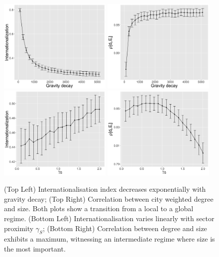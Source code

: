 \documentclass[11pt]{article}
\begin{document}
\begin{figure}
	\includegraphics[width=0.48\textwidth,height=0.25\textheight]{figures/internationalization-gravityDecay_errorbars.png}
    \includegraphics[width=0.48\textwidth,height=0.25\textheight]{figures/rhoDegreeSize-gravityDecay_errorbars.png}\\
    \includegraphics[width=0.48\textwidth,height=0.25\textheight]{figures/internationalization-gammaSectors_errorbars.png}
    \includegraphics[width=0.48\textwidth,height=0.25\textheight]{figures/rhoDegreeSize-gammaSectors_errorbars.png}
    \caption{(Top Left) Internationalisation index decreases exponentially with gravity decay; (Top Right) Correlation between city weighted degree and size. Both plots show a transition from a local to a global regime. (Bottom Left) Internationalisation varies linearly with sector proximity $\gamma_S$; (Bottom Right) Correlation between degree and size exhibits a maximum, witnessing an intermediate regime where size is the most important. \label{fig:onefactor}}
\end{figure}
\end{document}
